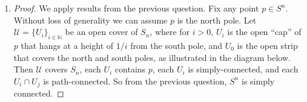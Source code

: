 \documentclass{article}
\begin{document}
\begin{enumerate}
\begin{proof}
      Since each $\gamma_i$ is a simple loop at $p$, the concatenation of
      them will also be simple loop at $p$, as required.
    \end{proof}

    \item
    \begin{proof}
      We apply results from the previous question. Fix any point $p\in
      S^n$. Without loss of generality we can assume $p$ is the north pole.
      Let $\mathcal{U}=\{U_i\}_{i\in\mathbb{N}}$ be an open cover of $S_n$,
      where for $i>0$, $U_i$ is the open ``cap'' of $p$ that hangs at a
      height of $1/i$ from the south pole, and $U_0$ is the open strip that
      covers the north and south poles, as illustrated in the diagram
      below. Then $\mathcal{U}$ covers $S_n$, each $U_i$ contains $p$, each
      $U_i$ is simply-connected, and each $U_i\cap U_j$ is path-connected.
      So from the previous question, $S^n$ is simply connected.
    \end{proof}
\end{enumerate}
\end{document}
